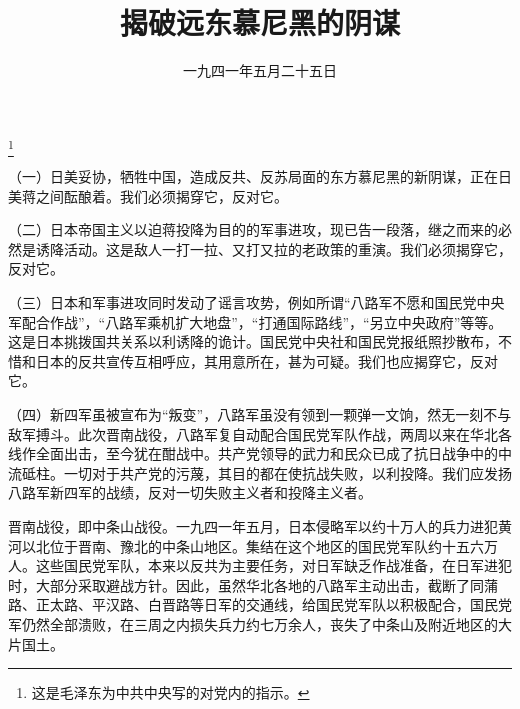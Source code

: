 
\title{揭破远东慕尼黑的阴谋}
\date{一九四一年五月二十五日}
\thanks{这是毛泽东为中共中央写的对党内的指示。}
\maketitle


（一）日美妥协，牺牲中国，造成反共、反苏局面的东方慕尼黑的新阴谋，正在日美蒋之间酝酿着。我们必须揭穿它，反对它。

（二）日本帝国主义以迫蒋投降为目的的军事进攻，现已告一段落，继之而来的必然是诱降活动。这是敌人一打一拉、又打又拉的老政策的重演。我们必须揭穿它，反对它。

（三）日本和军事进攻同时发动了谣言攻势，例如所谓“八路军不愿和国民党中央军配合作战”，“八路军乘机扩大地盘”，“打通国际路线”，“另立中央政府”等等。这是日本挑拨国共关系以利诱降的诡计。国民党中央社和国民党报纸照抄散布，不惜和日本的反共宣传互相呼应，其用意所在，甚为可疑。我们也应揭穿它，反对它。

（四）新四军虽被宣布为“叛变”，八路军虽没有领到一颗弹一文饷，然无一刻不与敌军搏斗。此次晋南战役，八路军复自动配合国民党军队作战，两周以来在华北各线作全面出击，至今犹在酣战中。共产党领导的武力和民众已成了抗日战争中的中流砥柱。一切对于共产党的污蔑，其目的都在使抗战失败，以利投降。我们应发扬八路军新四军的战绩，反对一切失败主义者和投降主义者。


\begin{maonote}
晋南战役，即中条山战役。一九四一年五月，日本侵略军以约十万人的兵力进犯黄河以北位于晋南、豫北的中条山地区。集结在这个地区的国民党军队约十五六万人。这些国民党军队，本来以反共为主要任务，对日军缺乏作战准备，在日军进犯时，大部分采取避战方针。因此，虽然华北各地的八路军主动出击，截断了同蒲路、正太路、平汉路、白晋路等日军的交通线，给国民党军队以积极配合，国民党军仍然全部溃败，在三周之内损失兵力约七万余人，丧失了中条山及附近地区的大片国土。
\end{maonote}
